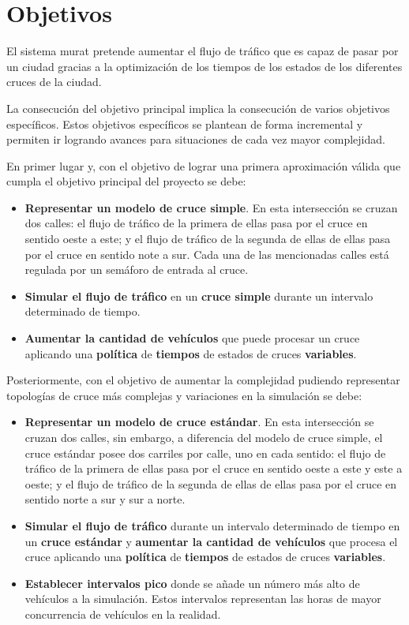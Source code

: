 \section{Objetivos}
El sistema \acrshort{murat} pretende aumentar el flujo de tráfico que es capaz de pasar por un ciudad gracias a la optimización de los tiempos de los estados de los diferentes cruces de la ciudad.

La consecución del objetivo principal implica la consecución de varios objetivos específicos. Estos objetivos específicos se plantean de forma incremental y permiten ir logrando avances para situaciones de cada vez mayor complejidad.

En primer lugar y, con el objetivo de lograr una primera aproximación válida que cumpla el objetivo principal del proyecto se debe:
\begin{itemize}
    \item \textbf{Representar un modelo de cruce simple}. En esta intersección se cruzan dos calles: el flujo de tráfico de la primera de ellas pasa por el cruce en sentido oeste a este; y el flujo de tráfico de la segunda de ellas de ellas pasa por el cruce en sentido note a sur. Cada una de las mencionadas calles está regulada por un semáforo de entrada al cruce.
    \item \textbf{Simular el flujo de tráfico} en un \textbf{cruce simple} durante un intervalo determinado de tiempo.
    \item \textbf{Aumentar la cantidad de vehículos} que puede procesar un cruce aplicando una \textbf{política} de \textbf{tiempos} de estados de cruces \textbf{variables}.
\end{itemize}

Posteriormente, con el objetivo de aumentar la complejidad pudiendo representar topologías de cruce más complejas y variaciones en la simulación se debe:
\begin{itemize}
    \item \textbf{Representar un modelo de cruce estándar}. En esta intersección se cruzan dos calles, sin embargo, a diferencia del modelo de cruce simple, el cruce estándar posee dos carriles por calle, uno en cada sentido: el flujo de tráfico de la primera de ellas pasa por el cruce en sentido oeste a este y este a oeste; y el flujo de tráfico de la segunda de ellas de ellas pasa por el cruce en sentido norte a sur y sur a norte.
    \item \textbf{Simular el flujo de tráfico} durante un intervalo determinado de tiempo en un \textbf{cruce estándar} y \textbf{aumentar la cantidad de vehículos} que procesa el cruce aplicando una \textbf{política} de \textbf{tiempos} de estados de cruces \textbf{variables}.
    \item \textbf{Establecer intervalos pico} donde se añade un número más alto de vehículos a la simulación. Estos intervalos representan las horas de mayor concurrencia de vehículos en la realidad.
\end{itemize}

